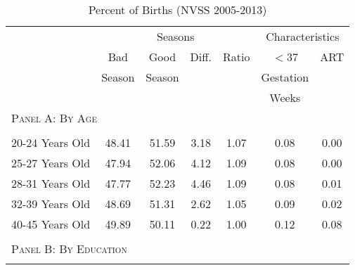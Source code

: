 \documentclass[a4paper, 12 pt]{article}
\theoremstyle{plain}
\begin{document}
\begin{doublespace}
\begin{table}[htpb!]\caption{Percent of Births (NVSS 2005-2013)}
\label{bqTab:singleSum}\begin{center}\begin{tabular}{lcccccc}
\toprule \toprule
& \multicolumn{4}{c}{Seasons} & \multicolumn{2}{c}{Characteristics} \\ \cmidrule(r){2-5} \cmidrule(r){6-7}
& Bad    & Good   & Diff. & Ratio & $< $37 & ART \\
& Season & Season &       &       & Gestation  & \\
&     &   &       &       & Weeks  &     \\\midrule\multicolumn{5}{l}{\textsc{Panel A: By Age}}\\
\begin{footnotesize}\end{footnotesize}&
\begin{footnotesize}\end{footnotesize}&
\begin{footnotesize}\end{footnotesize}&
\begin{footnotesize}\end{footnotesize}&
\begin{footnotesize}\end{footnotesize}\\
20-24 Years Old&48.41&51.59&3.18&1.07&0.08&0.00
\\
25-27 Years Old&47.94&52.06&4.12&1.09&0.08&0.00
\\
28-31 Years Old&47.77&52.23&4.46&1.09&0.08&0.01
\\
32-39 Years Old&48.69&51.31&2.62&1.05&0.09&0.02
\\
40-45 Years Old&49.89&50.11&0.22&1.00&0.12&0.08
\\
 &&&&&& \\\multicolumn{7}{l}{\textsc{Panel B: By Education}}\\
\begin{footnotesize}\end{footnotesize}&
\begin{footnotesize}\end{footnotesize}&
\begin{footnotesize}\end{footnotesize}&
\begin{footnotesize}\end{footnotesize}&
\begin{footnotesize}\end{footnotesize}\\

\end{tabular}
\end{center}
\end{table}
\end{doublespace}
\end{document}
